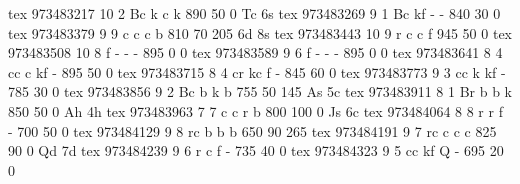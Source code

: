 tex       973483217 10  2 Bc  k     c     k          890   50    0 Tc 6s
tex       973483269  9  1 Bc  kf    -     -          840   30    0 
tex       973483379  9  9 c   c     c     b          810   70  205 6d 8s
tex       973483443 10  9 r   c     c     f          945   50    0 
tex       973483508 10  8 f   -     -     -          895    0    0 
tex       973483589  9  6 f   -     -     -          895    0    0 
tex       973483641  8  4 cc  c     kf    -          895   50    0 
tex       973483715  8  4 cr  kc    f     -          845   60    0 
tex       973483773  9  3 cc  k     kf    -          785   30    0 
tex       973483856  9  2 Bc  b     k     b          755   50  145 As 5c
tex       973483911  8  1 Br  b     b     k          850   50    0 Ah 4h
tex       973483963  7  7 c   c     r     b          800  100    0 Js 6c
tex       973484064  8  8 r   r     f     -          700   50    0 
tex       973484129  9  8 rc  b     b     b          650   90  265 
tex       973484191  9  7 rc  c     c     c          825   90    0 Qd 7d
tex       973484239  9  6 r   c     f     -          735   40    0 
tex       973484323  9  5 cc  kf    Q     -          695   20    0 
